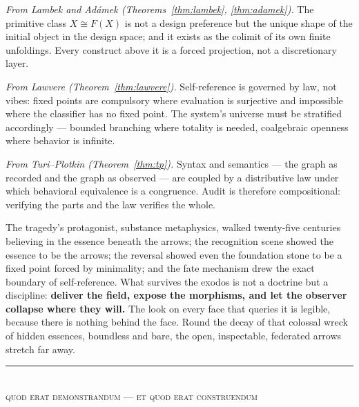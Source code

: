 \documentclass[11pt]{article}
\theoremstyle{plain}
\theoremstyle{definition}
\theoremstyle{remark}
\begin{document}
\emph{From Lambek and Ad\'amek (Theorems~\ref{thm:lambek}, \ref{thm:adamek}).} The primitive class $X \cong F(X)$ is not a design preference but the unique shape of the initial object in the design space; and it exists as the colimit of its own finite unfoldings. Every construct above it is a forced projection, not a discretionary layer.

\emph{From Lawvere (Theorem~\ref{thm:lawvere}).} Self-reference is governed by law, not vibes: fixed points are compulsory where evaluation is surjective and impossible where the classifier has no fixed point. The system's universe must be stratified accordingly --- bounded branching where totality is needed, coalgebraic openness where behavior is infinite.

\emph{From Turi--Plotkin (Theorem~\ref{thm:tp}).} Syntax and semantics --- the graph as recorded and the graph as observed --- are coupled by a distributive law under which behavioral equivalence is a congruence. Audit is therefore compositional: verifying the parts and the law verifies the whole.

The tragedy's protagonist, substance metaphysics, walked twenty-five centuries believing in the essence beneath the arrows; the recognition scene showed the essence to be the arrows; the reversal showed even the foundation stone to be a fixed point forced by minimality; and the fate mechanism drew the exact boundary of self-reference. What survives the exodos is not a doctrine but a discipline: \textbf{deliver the field, expose the morphisms, and let the observer collapse where they will.} The look on every face that queries it is legible, because there is nothing behind the face. Round the decay of that colossal wreck of hidden essences, boundless and bare, the open, inspectable, federated arrows stretch far away.

\vspace{2em}
\begin{center}
\color{silmaril}\rule{0.3\textwidth}{0.4pt}\\[0.6em]
\textsc{quod erat demonstrandum --- et quod erat construendum}
\end{center}
\end{document}
